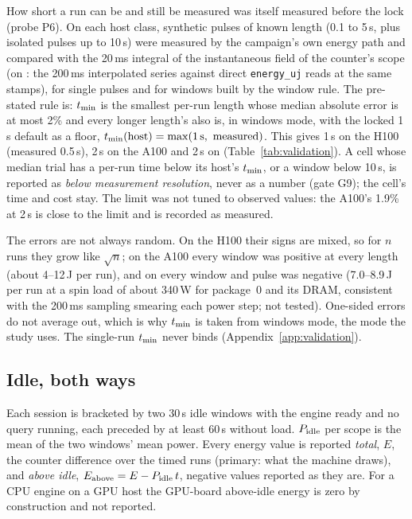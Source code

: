 \documentclass[sigconf]{acmart}
\begin{document}
How short a run can be and still be measured was itself measured before the lock (probe P6). On
each host class, synthetic pulses of known length (0.1 to 5\,s, plus isolated pulses up to
10\,s) were measured by the campaign's own energy path and compared with the 20\,ms integral of
the instantaneous field of the counter's scope (on \CG: the 200\,ms interpolated series against
direct \texttt{energy\_uj} reads at the same stamps), for single pulses and for windows built by
the window rule. The pre-stated rule is: $t_{\min}$ is the smallest per-run length whose median
absolute error is at most 2\% and every longer length's also is, in windows mode, with the
locked 1\,s default as a floor, $t_{\min}(\text{host}) = \max(1\,\text{s},\ \text{measured})$. This
gives 1\,s on the H100 (measured 0.5\,s), 2\,s on the A100 and 2\,s on \CG{}
(Table~\ref{tab:validation}). A cell whose median trial has a per-run time below its host's
$t_{\min}$, or a window below 10\,s, is reported as \emph{below measurement resolution}, never as a
number (gate G9); the cell's time and cost stay. The limit was not tuned to observed values: the A100's 1.9\% at 2\,s is close
to the limit and is recorded as measured.

The errors are not always random. On the H100 their signs are mixed, so for $n$ runs they grow
like $\sqrt{n}$; on the A100 every window was positive at every length (about 4--12\,J per run),
and on \CG{} every window and pulse was negative (7.0--8.9\,J per run at a spin load of about
340\,W for package~0 and its DRAM, consistent with the 200\,ms sampling smearing each power step;
not tested). One-sided errors do not average out, which is why $t_{\min}$ is taken from windows
mode, the mode the study uses. The single-run $t_{\min}$ never binds (Appendix~\ref{app:validation}).

\subsection{Idle, both ways}
\label{sec:idle}
Each session is bracketed by two 30\,s idle windows with the engine ready and no query running,
each preceded by at least 60\,s without load. $P_{\mathrm{idle}}$ per scope is the mean of the two windows'
mean power. Every energy value is reported \emph{total}, $E$, the counter difference over the
timed runs (primary: what the machine draws), and \emph{above idle}, $E_{\mathrm{above}} = E - P_{\mathrm{idle}}\, t$,
negative values reported as they are. For a CPU engine on a GPU host the GPU-board above-idle
energy is zero by construction and not reported.
\end{document}
